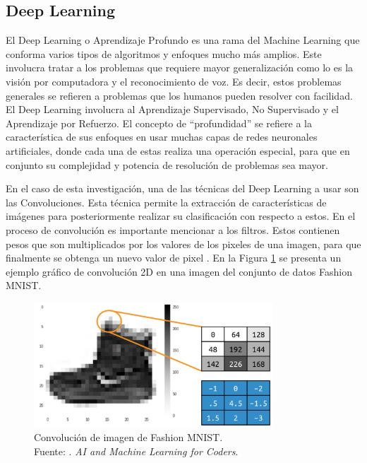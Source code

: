 \subsection{Deep Learning}

El Deep Learning o Aprendizaje Profundo es una rama del Machine Learning que conforma varios tipos de algoritmos y enfoques mucho más amplios. Este involucra tratar a los problemas que requiere mayor generalización como lo es la visión por computadora y el reconocimiento de voz. Es decir, estos problemas generales se refieren a problemas que los humanos pueden resolver con facilidad. El Deep Learning involucra al Aprendizaje Supervisado, No Supervisado y el Aprendizaje por Refuerzo. El concepto de “profundidad” se refiere a la característica de sus enfoques en usar muchas capas de redes neuronales artificiales, donde cada una de estas realiza una operación especial, para que en conjunto su complejidad y potencia de resolución de problemas sea mayor. \parencite{bk_hurbans2020grokking}

En el caso de esta investigación, una de las técnicas del Deep Learning a usar son las Convoluciones. Esta técnica permite la extracción de características de imágenes para posteriormente realizar su clasificación con respecto a estos. En el proceso de convolución es importante mencionar a los filtros. Estos contienen pesos que son multiplicados por los valores de los pixeles de una imagen, para que finalmente se obtenga un nuevo valor de pixel \parencite{bk_moroney2020aiandml}. En la Figura \ref{2:fig201} se presenta un ejemplo gráfico de convolución 2D en una imagen del conjunto de datos Fashion MNIST.

\begin{figure}[H]
	\begin{center}
		\includegraphics[width=0.80\textwidth]{2/figures/cnn_fash_mnist.png}
		\caption[Convolución de imagen de Fashion MNIST]{Convolución de imagen de Fashion MNIST. \\
		Fuente: \cite{bk_moroney2020aiandml}. \textit{AI and Machine Learning for Coders}.}
		\label{2:fig201}
	\end{center}
\end{figure}

